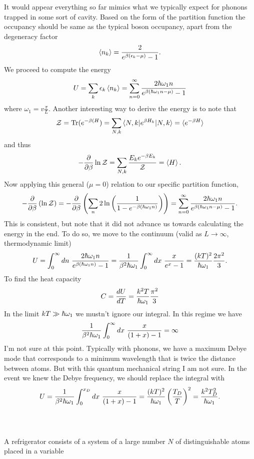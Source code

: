 \documentclass[10pt,letterpaper]{article}
\begin{document}
	\item
	It would appear everything so far mimics what we typically expect for phonons trapped in some sort of
	cavity. Based on the form of the partition function the occupancy should be same as the typical boson 
	occupancy, apart from the degeneracy factor
	\[
		\braket{n_k} = \frac{2}{e^{\beta(\ep_k -\mu)}-1}.
	\]
	We proceed to compute the energy
	\[
		U = \sum_k \ep_k\braket{n_k} = \sum_{n=0}^{\infty} \frac{2\h\omega_1 n}{e^{\beta(\h\omega_1 n-\mu)}-1}
	\]
	where $\omega_1 = v\frac{\pi}{L}$. Another interesting way to derive the energy is to note that
	\[
		\mathcal Z = \tr(e^{-\beta(H}) = \sum_{N,k} \braket{N,k|e^{\beta H_k}|N,k}  = \braket{e^{-\beta H}}
	\]
	and thus
	\[
		-\pdiff{\beta} \ln \mathcal Z = \sum_{N,k} \frac{E_k e^{-\beta E_k}}{\mathcal Z} = \braket{H}.
	\]
	Now applying this general ($\mu =0$) relation to our specific partition function,
	\[
		-\pdiff{\beta} \plr{\ln \mathcal Z} = -\pdiff{\beta}\plr{\sum_n 2\ln\pfrac{1}{1-e^{-\beta(\h\omega_1 n)}}}
		= \sum_{n=0}^{\infty} \frac{2\h\omega_1 n}{e^{\beta(\h\omega_1 n-\mu)}-1}.
	\]
	This is consistent, but note that it did not advance us towards calculating the energy in the end. To do so,
	we move to the continuum (valid as $L\to \infty$, thermodynamic limit)
	\[
		U = \int_0^\infty dn\ \frac{2\h\omega_1 n}{e^{\beta(\h\omega_1 n)}-1} = \frac{1}{\beta^2\h\omega_1}
		\int_0^\infty dx\ \frac{x}{e^x-1} = \frac{(kT)^2}{\h\omega_1}\frac{2\pi^2}{3}.
	\]
	To find the heat capacity
	\[
		C = \diff[U]{T} = \frac{k^2 T}{\h\omega_1}\frac{\pi^2}{3}
	\]
	In the limit $kT\gg \h\omega_1$ we mustn't ignore our integral. In this regime we have
	\[
		 \frac{1}{\beta^2\h\omega_1} \int_0^\infty dx\ \frac{x}{(1+x)-1} = \infty
	\]
	I'm not sure at this point. Typically with phonons, we have a maximum Debye mode that corresponds 
	to a minimum wavelength that is twice the distance between atoms. But with this quantum mechanical string
	I am not sure. In the event we knew the Debye frequency, we should replace the integral with
	\[
		U = \frac{1}{\beta^2\h\omega_1} \int_0^{x_D} dx\ \frac{x}{(1+x)-1} 
		 = \frac{(kT)^2}{\h\omega_1}\pfrac{T_D}{T}^2 = \frac{k^2T_D^2}{\h\omega_1}.
	\]
	\\
	\\
	\eenum 
	\item
	A refrigerator consists of a system of a large number $N$ of distinguishable atoms placed in a variable
\end{document}
